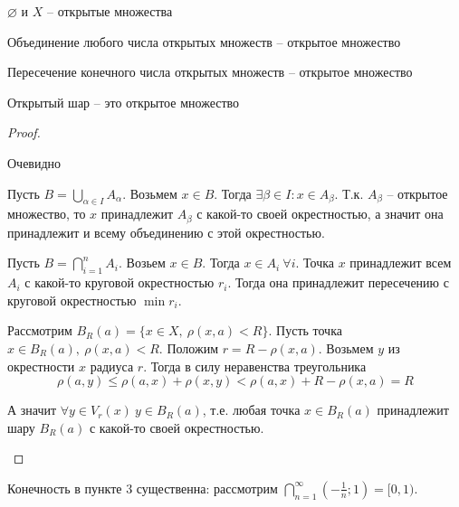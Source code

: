     \begin{Thm}
        \begin{MyList}
            \item $\varnothing$ и $X$ -- открытые множества
            \item Объединение любого числа открытых множеств -- открытое множество
            \item Пересечение конечного числа открытых множеств -- открытое множество
            \item Открытый шар -- это открытое множество  
        \end{MyList}
    \end{Thm}

    \begin{proof}
        \begin{MyList}
            \item Очевидно
            \item Пусть $B = \bigcup_{\alpha \in I} A_\alpha$. Возьмем $x \in B$. Тогда $\exists \beta \in I : x \in A_\beta$. Т.к. $A_\beta$ -- открытое множество, то 
            $x$ принадлежит $A_\beta$ с какой-то своей окрестностью, а значит она принадлежит и всему объединению с этой окрестностью.

            \item Пусть $B = \bigcap_{i = 1}^n A_i$. Возьем $x \in B$. Тогда $x \in A_i \ \forall i$. Точка $x$ принадлежит всем $A_i$ с какой-то круговой окрестностью $r_i$. Тогда она принадлежит пересечению с круговой окрестностью $\min r_i$.    
            \item Рассмотрим $B_R(a) = \{x \in X, \ \rho(x, a) < R\}$. Пусть точка $x \in B_R(a), \ \rho(x, a) < R$. Положим $r = R - \rho(x, a)$. Возьмем $y$ из окрестности $x$ радиуса $r$. Тогда в силу неравенства треугольника
            \[\rho(a, y) \leqslant \rho(a, x) + \rho(x, y) < \rho(a, x) + R - \rho(x, a) = R\]
            \begin{figure}[H]
                \centering
                \def\svgwidth{.3\columnwidth}
                
            \end{figure}

            А значит $\forall y \in V_r(x) \ y \in B_R(a)$, т.е. любая точка $x \in B_R(a)$ принадлежит шару $B_R(a)$ с какой-то своей окрестностью.
        \end{MyList}
    \end{proof}

    \begin{Rem}
        Конечность в пункте 3 существенна: рассмотрим $\bigcap_{n = 1}^\infty \left(-\frac{1}{n}; 1\right) = [0, 1)$. 
    \end{Rem}

